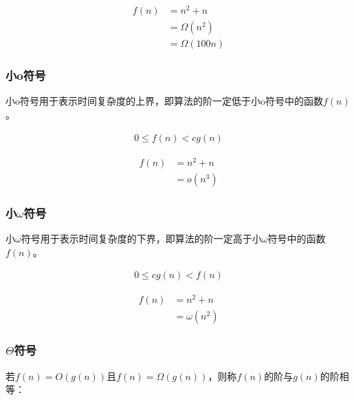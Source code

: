 \vspace{-1cm}

\begin{align*}
	f(n) & = n^2 + n      \\
	     & = \Omega(n^2)  \\
	     & = \Omega(100n)
\end{align*}

\subsubsection{小o符号}

小o符号用于表示时间复杂度的上界，即算法的阶一定低于小o符号中的函数$ f(n) $。

\vspace{-0.5cm}

\begin{align}
	0 \le f(n) < cg(n)
\end{align}

\vspace{-1cm}

\begin{align*}
	f(n) & = n^2 + n \\
	     & = o(n^3)
\end{align*}

\subsubsection{小$ \omega $符号}

小$ \omega $符号用于表示时间复杂度的下界，即算法的阶一定高于小$ \omega $符号中的函数$ f(n) $。

\vspace{-0.5cm}

\begin{align}
	0 \le cg(n) < f(n)
\end{align}

\vspace{-1cm}

\begin{align*}
	f(n) & = n^2 + n     \\
	     & = \omega(n^2)
\end{align*}

\subsubsection{$ \Theta $符号}

若$ f(n) = O(g(n)) $且$ f(n) = \Omega(g(n)) $，则称$ f(n) $的阶与$ g(n) $的阶相等：

